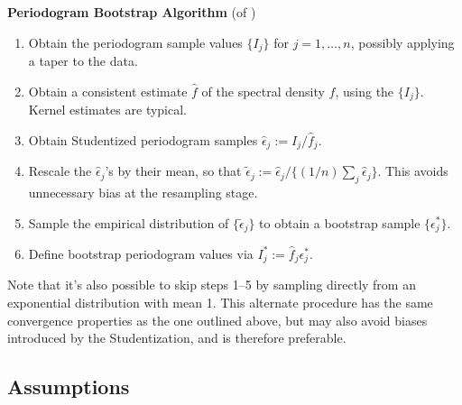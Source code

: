 \textbf{Periodogram Bootstrap Algorithm} (of \cite{bootstrap})
\begin{enumerate}
\item Obtain the periodogram sample values $\{I_j\}$ for $j=1,\ldots,n$, possibly applying a taper to the data.
\item Obtain a consistent estimate $\hat f$ of the spectral density $f$, using the $\{I_j\}$. Kernel estimates are typical. 
\item Obtain Studentized periodogram samples $\hat\epsilon_j := I_j / \hat f_j$. 
\item Rescale the $\hat\epsilon_j$'s by their mean, so that $\tilde\epsilon_j := \hat\epsilon_j / \{(1/n) \sum_j \hat\epsilon_j\}$. This avoids unnecessary bias at the resampling stage. 
\item Sample the empirical distribution of $\{\tilde\epsilon_j\}$ to obtain a bootstrap sample $\{\epsilon^*_j\}$. 
\item Define bootstrap periodogram values via $I_j^* := \hat f_j \epsilon^*_j$.
\end{enumerate}
Note that it's also possible to skip steps 1--5 by sampling directly from an
exponential distribution with mean 1.
This alternate procedure has the same convergence properties as the one
outlined above, but may also avoid biases introduced by the Studentization,
and is therefore preferable.

\subsection*{Assumptions}

